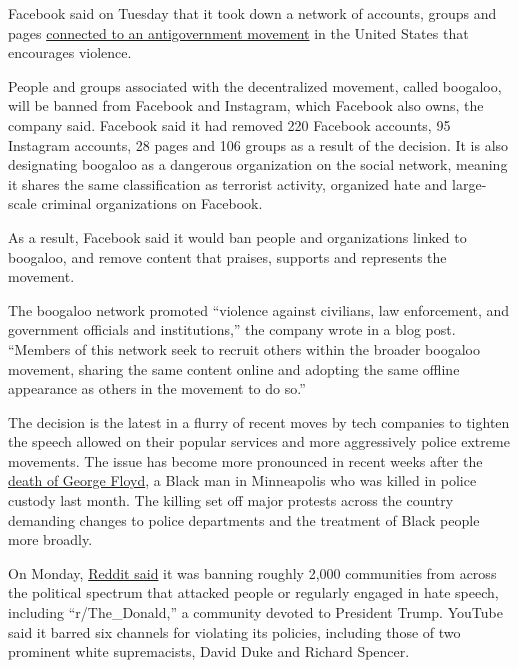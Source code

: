 Facebook said on Tuesday that it took down a network of accounts, groups
and pages
\href{https://about.fb.com/news/2020/06/banning-a-violent-network-in-the-us/}{connected
to an antigovernment movement} in the United States that encourages
violence.

People and groups associated with the decentralized movement, called
boogaloo, will be banned from Facebook and Instagram, which Facebook
also owns, the company said. Facebook said it had removed 220 Facebook
accounts, 95 Instagram accounts, 28 pages and 106 groups as a result of
the decision. It is also designating boogaloo as a dangerous
organization on the social network, meaning it shares the same
classification as terrorist activity, organized hate and large-scale
criminal organizations on Facebook.

As a result, Facebook said it would ban people and organizations linked
to boogaloo, and remove content that praises, supports and represents
the movement.

The boogaloo network promoted ``violence against civilians, law
enforcement, and government officials and institutions,'' the company
wrote in a blog post. ``Members of this network seek to recruit others
within the broader boogaloo movement, sharing the same content online
and adopting the same offline appearance as others in the movement to do
so.''

The decision is the latest in a flurry of recent moves by tech companies
to tighten the speech allowed on their popular services and more
aggressively police extreme movements. The issue has become more
pronounced in recent weeks after the
\href{https://www.nytimes3xbfgragh.onion/2020/05/31/us/george-floyd-investigation.html}{death
of George Floyd}, a Black man in Minneapolis who was killed in police
custody last month. The killing set off major protests across the
country demanding changes to police departments and the treatment of
Black people more broadly.

On Monday,
\href{https://www.nytimes3xbfgragh.onion/2020/06/29/technology/reddit-hate-speech.html}{Reddit
said} it was banning roughly 2,000 communities from across the political
spectrum that attacked people or regularly engaged in hate speech,
including ``r/The\_Donald,'' a community devoted to President Trump.
YouTube said it barred six channels for violating its policies,
including those of two prominent white supremacists, David Duke and
Richard Spencer.

